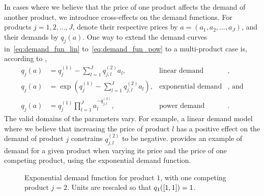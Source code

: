 \documentclass[main.tex]{subfiles}
\begin{document}
In cases where we believe that the price of one product affects the
demand of another product, we introduce cross-effects on the demand
functions. For products $j=1,2,\dots,J$, denote their respective prices by
$a=(a_1,a_2,\dots,a_J)$, and their demands by $q_j(a)$.
One way to extend the demand curves in~\eqref{eq:demand_fun_lin}
to~\eqref{eq:demand_fun_pow} to a multi-product case is, according to \citet{talluri2006theory},
\begin{align}
  q_j(a)&=q_{j}^{(1)}-\sum_{l=1}^Jq_{j,l}^{(2)}a_l,
  &\text{linear demand}&,\\
  q_j(a)&=\exp\left( q_{j}^{(1)}-\sum_{l=1}^Jq_{j,l}^{(2)}a_l
          \right),
  &\text{exponential demand}&\text{, and}\\
  q_j(a)&=q_j^{(1)}\prod_{l=1}^Ja_l^{-q_{j,l}^{(2)}},
  &\text{power demand}&.
\end{align}
The valid domains of the parameters vary. For example, a linear demand
model where we believe that increasing the price of product $l$ has a
positive effect on the demand of product $j$ constrains
$q_{j,l}^{(2)}$ to be negative. 
provides an example of demand for a given product when varying
its price and the price of one competing product, using the exponential demand function.

\begin{figure}[htbp]
  \centering
  \caption[Exponential demand function]{Exponential demand function for product $1$, with one
    competing product $j=2$.
    Units are rescaled so that $q_1(\left[1,1\right])=1$.
  }\label{fig:demand_exponential_two}
\end{figure}
\end{document}
